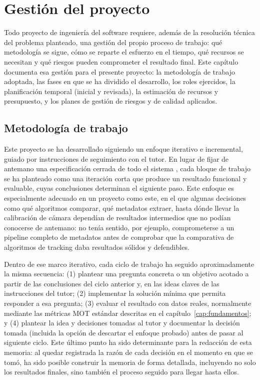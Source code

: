 \chapter{Gestión del proyecto}
\label{cap:gestion}

Todo proyecto de ingeniería del software requiere, además de la resolución
técnica del problema planteado, una gestión del propio proceso de
trabajo: qué metodología se sigue, cómo se reparte el esfuerzo en el tiempo,
qué recursos se necesitan y qué riesgos pueden comprometer el resultado
final. Este capítulo documenta esa gestión para el presente proyecto: la
metodología de trabajo adoptada, las fases en que se ha dividido el
desarrollo, los roles ejercidos, la planificación temporal (inicial y
revisada), la estimación de recursos y presupuesto, y los planes de gestión
de riesgos y de calidad aplicados.

\section{Metodología de trabajo}
\label{sec:gestion-metodologia}

Este proyecto se ha desarrollado siguiendo un enfoque iterativo e
incremental, guiado por instrucciones de seguimiento con el tutor.
En lugar de fijar de antemano una especificación cerrada de todo el sistema
, cada bloque de trabajo se ha
planteado como una iteración corta que produce un resultado funcional y
evaluable, cuyas conclusiones determinan el siguiente paso. Este enfoque es
especialmente adecuado en un proyecto como este,
en el que algunas decisiones como qué algoritmos comparar, qué metadatos
extraer, hasta dónde llevar la calibración de cámara dependían de
resultados intermedios que no podían conocerse de antemano: no tenía
sentido, por ejemplo, comprometerse a un pipeline completo de metadatos
antes de comprobar que la comparativa de algoritmos de tracking daba
resultados sólidos y defendibles.

Dentro de ese marco iterativo, cada ciclo de trabajo ha seguido
aproximadamente la misma secuencia: (1) plantear una pregunta concreta o un
objetivo acotado a partir de las conclusiones del ciclo anterior y, en las
ideas claves de las instrucciones del tutor; (2) implementar la
solución mínima que permita responder a esa pregunta; (3) evaluar el
resultado con datos reales, normalmente mediante las métricas MOT estándar
descritas en el capítulo~\ref{cap:fundamentos}; y (4) plantear la idea y 
decisiones tomadas al tutor y documentar la decisión
tomada (incluida la opción de descartar el enfoque probado) antes de
pasar al siguiente ciclo. Este último punto ha sido determinante para la
redacción de esta memoria: al quedar registrada la razón de cada decisión
en el momento en que se tomó, ha sido posible construir la memoria de forma
detallada, incluyendo no solo los resultados finales, sino también el proceso seguido para llegar hasta ellos.

